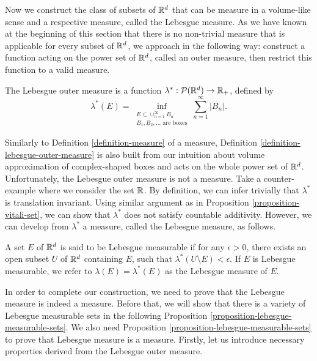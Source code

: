 Now we construct the class of subsets of $\mathbb{R}^d$ that can be measure in a volume-like sense and a respective measure, called the Lebesgue measure. As we have known at the beginning of this section that there is no non-trivial measure that is applicable for every subset of $\mathbb{R}^d$, we approach in the following way: construct a function acting on the power set of $\mathbb{R}^d$, called an outer measure, then restrict this function to a valid measure.

\begin{definition}
  \label{definition-lebesgue-outer-measure}
  The Lebesgue outer measure is a function $\lambda^*: \mathcal{P}(\mathbb{R}^d)\to \mathbb{R}_+$, defined by
  \begin{equation}
    \lambda^*(E) = \inf\limits_{\substack{E\subset\cup_{n=1}^\infty B_n \\ B_1,B_2,\ldots \text{ are boxes}}} \sum\limits_{n=1}^\infty |B_n|.
  \end{equation}
\end{definition}

Similarly to Definition \ref{definition-measure} of a measure, Definition \ref{definition-lebesgue-outer-measure} is also built from our intuition about volume approximation of complex-shaped boxes and acts on the whole power set of $\mathbb{R}^d$. Unfortunately, the Lebesgue outer measure is not a measure. Take a counter-example where we consider the set $\mathbb{R}$. By definition, we can infer trivially that $\lambda^*$ is translation invariant. Using similar argument as in Proposition \ref{proposition-vitali-set}, we can show that $\lambda^*$ does not satisfy countable additivity. However, we can develop from $\lambda^*$ a measure, called the Lebesgue measure, as follows.

\begin{definition}
  A set $E$ of $\mathbb{R}^d$ is said to be Lebesgue measurable if for any $\epsilon>0$, there exists an open subset $U$ of $\mathbb{R}^d$ containing $E$, such that $\lambda^*(U\setminus E) < \epsilon$. If $E$ is Lebesgue measurable, we refer to $\lambda(E) = \lambda^*(E)$ as the Lebesgue measure of $E$.
\end{definition}

In order to complete our construction, we need to prove that the Lebesgue measure is indeed a measure. Before that, we will show that there is a variety of Lebesgue measurable sets in the following Proposition \ref{proposition-lebesgue-measurable-sets}. We also need Proposition \ref{proposition-lebesgue-measurable-sets} to prove that Lebesgue measure is a measure.  Firstly, let us introduce necessary properties derived from the Lebesgue outer measure.

